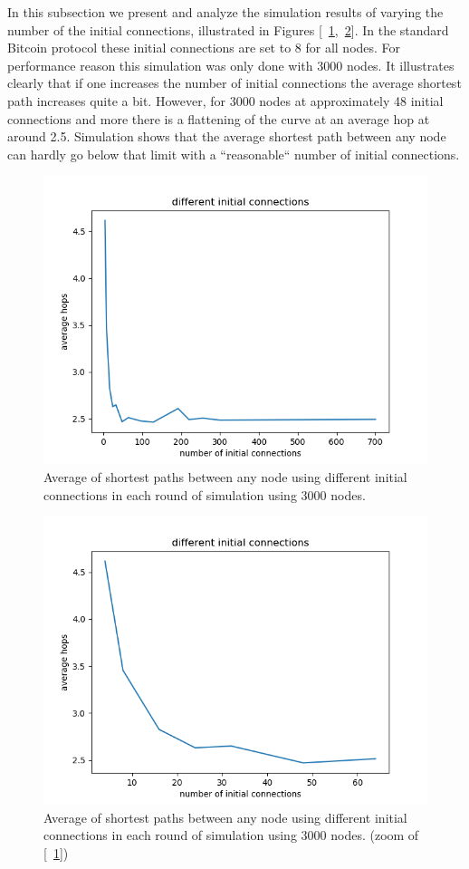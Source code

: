 \documentclass[a4paper, oneside]{discothesis}
\begin{document}
In this subsection we present and analyze the simulation results of varying the number of the initial connections, illustrated in Figures [~\ref{fig:initConnectDistribution8variation-big},~\ref{fig:initConnectDistribution8variation-small}]. In the standard Bitcoin protocol these initial connections are set to 8 for all nodes. For performance reason this simulation was only done with 3000 nodes.
It illustrates clearly that if one increases the number of initial connections the average shortest path increases quite a bit. However, for 3000 nodes at approximately 48 initial connections and more there is a flattening of the curve at an average hop at around 2.5. Simulation shows that the average shortest path between any node can hardly go below that limit with a ``reasonable`` number of initial connections.

\begin{figure}
    \centering
    \includegraphics[width=.8\columnwidth]{figures/initConnectDistribution/8variation/3000nodes-bigRange.png}
    \caption{Average of shortest paths between any node using different initial connections in each round of simulation using 3000 nodes.}
    \label{fig:initConnectDistribution8variation-big}
\end{figure}

\begin{figure}
    \centering
    \includegraphics[width=.8\columnwidth]{figures/initConnectDistribution/8variation/3000nodes-smallRange.png}
    \caption{Average of shortest paths between any node using different initial connections in each round of simulation using 3000 nodes. (zoom of [~\ref{fig:initConnectDistribution8variation-big}])}
    \label{fig:initConnectDistribution8variation-small}
\end{figure}
\end{document}
